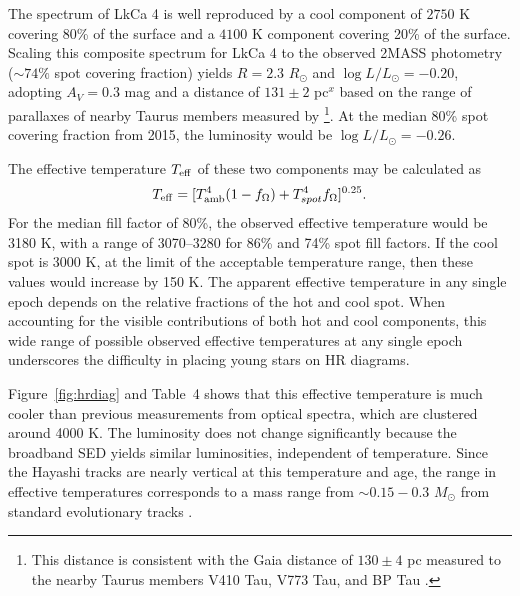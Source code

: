 \documentclass[twocolumn]{emulateapj}%
\begin{document}
The spectrum of LkCa 4 is well reproduced by a cool component of $2750$ K covering 80\% of the surface and a $4100$ K component covering 20\% of the surface.   Scaling this composite spectrum for LkCa 4 to the observed 2MASS photometry ($\sim 74\%$ spot covering fraction) yields $R=2.3$ $R_\odot$ and $\log L/L_\odot=-0.20$, adopting $A_V=0.3$ mag and a distance of $131 \pm 2$ pc$^x$ based on the range of parallaxes of nearby Taurus members measured by \citet{torres12}\footnote{This distance is consistent with the Gaia distance of $130 \pm4$ pc measured to the nearby Taurus members V410 Tau, V773 Tau, and BP Tau \citep{gaia2016dr}.}.  
At the median 80\% spot covering fraction from 2015, the luminosity would be $\log L/L_\odot=-0.26$.

The effective temperature $T_{\rm eff}$ of these two components may be calculated as
\begin{equation}
T_{\rm eff}=[T_{\rm amb}^4(1-f_{\Omega})+T_{spot}^4f_{\Omega}]^{0.25}.
\end{equation}
For the median fill factor of 80\%, the observed effective temperature would be 3180 K, with a range of 3070--3280 for 86\% and 74\% spot fill factors.  If the cool spot is 3000 K, at the limit of the acceptable temperature range, then these values would increase by 150 K.  The apparent effective temperature in any single epoch depends on the relative fractions of the hot and cool spot.  When accounting for the visible contributions of both hot and cool components, this wide range of possible observed effective temperatures at any single epoch underscores the difficulty in placing young stars on HR diagrams.  

Figure~\ref{fig:hrdiag} and Table~4 shows that this effective temperature is much cooler than previous measurements from optical spectra, which are clustered around 4000 K.  The luminosity does not change significantly because the broadband SED yields similar luminosities, independent of temperature.
Since the Hayashi tracks are nearly vertical at this temperature and age, the range in effective temperatures corresponds to a mass range from $\sim 0.15-0.3$ $M_\odot$ from standard evolutionary tracks \citep{baraffe15}. 
\end{document}

